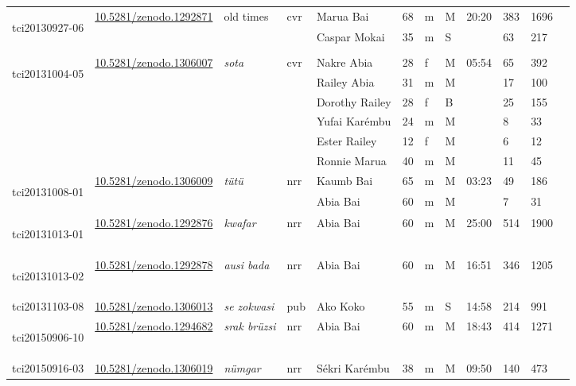 \begin{landscape}
{\begin{longtable}{p{}lllllllllll}
	\multirow{2}{*}{\hypertarget{tci20130927-06}{tci20130927-06}} &\multirow{2}{*}{\href{https://zenodo.org/record/1292871}{10.5281/zenodo.1292871}}& \multirow{2}{*}{old times} & \multirow{2}{*}{cvr} & Marua Bai & 68 & m & M & \multirow{2}{*}{20:20} & 383&1696\\
	&&&& Caspar Mokai & 35 & m & S & & 63&217\\\hline
	& & & & & & & & & \\
	\multirow{6}{*}{\hypertarget{tci20131004-05}{tci20131004-05}}&\multirow{6}{*}{\href{https://zenodo.org/record/1306007}{10.5281/zenodo.1306007}}&\multirow{6}{*}{\emph{sota}}&\multirow{6}{*}{cvr}&Nakre Abia & 28 & f & M & \multirow{6}{*}{05:54} & 65&392\\
	&&&&Railey Abia & 31 & m & M && 17&100\\
	&&&&Dorothy Railey & 28 & f & B && 25&155\\
	&&&&Yufai Karémbu & 24 & m & M &&8&33\\ 
	&&&&Ester Railey & 12 & f & M && 6&12\\
	&&&& Ronnie Marua & 40 & m & M &&11&45\\\hline
	\multirow{2}{*}{\hypertarget{tci20131008-01}{tci20131008-01}} &\multirow{2}{*}{\href{https://zenodo.org/record/1306009}{10.5281/zenodo.1306009}}& \multirow{2}{*}{\emph{tütü}} & \multirow{2}{*}{nrr} & Kaumb Bai & 65 & m & M & \multirow{2}{*}{03:23} & 49&186\\
	&&&& Abia Bai & 60 & m & M && 7&31 \\\hline
	\hypertarget{tci20131013-01}{tci20131013-01} &\href{https://zenodo.org/record/1292876}{10.5281/zenodo.1292876}& \emph{kwafar} & nrr & Abia Bai & 60 & m & M & 25:00 & 514 &1900\\\hline
	\hypertarget{tci20131013-02}{tci20131013-02} &\href{https://zenodo.org/record/1292878}{10.5281/zenodo.1292878}& \emph{ausi bada} & nrr & Abia Bai & 60 & m & M & 16:51 & 346&1205 \\\hline
	tci20131103-08 	&\href{https://zenodo.org/record/1306013}{10.5281/zenodo.1306013}& \emph{se zokwasi} & pub & Ako Koko & 55 & m & S & 14:58 & 214&991\\\hline
	\hypertarget{tci20150906-10}{tci20150906-10} &\href{https://zenodo.org/record/1294682}{10.5281/zenodo.1294682}& \emph{srak brüzsi} & nrr & Abia Bai & 60 & m & M & 18:43 & 414 &1271\\\hline
	\multirow{3}{*}{tci20150916-03} &\multirow{3}{*}{\href{https://zenodo.org/record/1306019}{10.5281/zenodo.1306019}}& \multirow{3}{*}{\emph{nümgar}} & \multirow{3}{*}{nrr} & Sékri Karémbu & 38 & m & M &\multirow{3}{*}{09:50}& 140&473\\

\end{longtable}}
\end{landscape}
